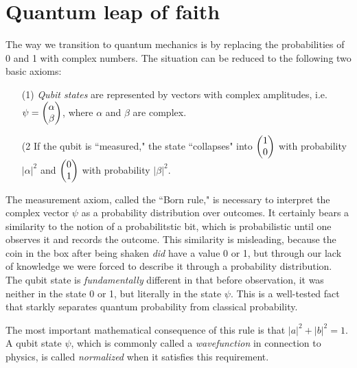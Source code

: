 \documentclass{article}
\begin{document}
\section{Quantum leap of faith}
The way we transition to quantum mechanics is by replacing the probabilities of 0 and 1 with complex numbers. The situation can be reduced to the following two basic axioms:
\begin{itemize}
\item[(1)] \textit{Qubit states} are represented by vectors with complex amplitudes, i.e. $\psi = \mqty(\alpha \\ \beta)$, where $\alpha$ and $\beta$ are complex. 
\item[(2] If the qubit is ``measured," the state ``collapses" into $\mqty(1 \\ 0)$ with probability $|\alpha|^2$ and $\mqty(0 \\ 1)$ with probability $|\beta|^2$. 
\end{itemize}
The measurement axiom, called the ``Born rule," is necessary to interpret the complex vector $\psi$ as a probability distribution over outcomes. It certainly bears a similarity to the notion of a probabilitstic bit, which is probabilistic until one observes it and records the outcome. This similarity is misleading, because the coin in the box after being shaken \textit{did} have a value 0 or 1, but through our lack of knowledge we were forced to describe it through a probability distribution. The qubit state is \textit{fundamentally} different in that before observation, it was neither in the state 0 or 1, but literally in the state $\psi$. This is a well-tested fact that starkly separates quantum probability from classical probability.
\par The most important mathematical consequence of this rule is that $|a|^2 + |b|^2 = 1$. A qubit state $\psi$, which is commonly called a \textit{wavefunction} in connection to physics, is called \textit{normalized} when it satisfies this requirement.
\end{document}
